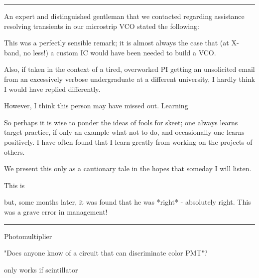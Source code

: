 \documentclass[paper.tex]{subfiles}
\begin{document}
\rule{\linewidth}{0.2pt}


An expert and distinguished gentleman that we contacted regarding assistance resolving transients in our microstrip VCO stated the following:



This was a perfectly sensible remark; it is almost always the case that (at X-band, no less!) a custom IC would have been needed to build a VCO.

Also, if taken in the context of a tired, overworked PI getting an unsolicited email from an excessively verbose undergraduate at a different university, I hardly think I would have replied differently.

However, I think this person may have missed out. Learning 

So perhaps it is wise to ponder the ideas of fools for skeet; one always learns target practice, if only an example what not to do, and occasionally one learns positively. I have often found that I learn greatly from working on the projects of others.

We present this only as a cautionary tale in the hopes that someday I will listen.

 This is 

but, some months later, it was found that he was *right* - absolutely right. This was a grave error in management!

\rule{\linewidth}{0.2pt}

Photomultiplier

"Does anyone know of a circuit that can discriminate color PMT"?

only works if scintillator


\end{document}
